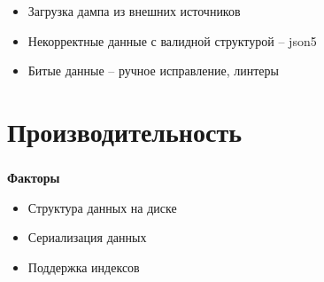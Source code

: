 \documentclass[usenames,dvipsnames, 18pt, compress, aspectratio=169]{beamer}
\begin{document}



\begin{frame}
    \frametitle{}
    \begin{center}
        \begin{itemize}[label={\MVRightarrow}]
            \item Загрузка дампа из внешних источников
            \item Некорректные данные с валидной структурой -- json5
            \item Битые данные -- ручное исправление, линтеры
        \end{itemize}
    \end{center}
\end{frame}

\fontsize{13pt}{14}\selectfont
\section{Производительность}
\fontsize{17pt}{18}\selectfont

\begin{frame}
    \frametitle{}
    \begin{center}
        \textbf{Факторы}
        \pause
        \begin{itemize}[label={\MVRightarrow}]
            \item <+-> Структура данных на диске
            \item <+-> Сериализация данных
            \item <+-> Поддержка индексов
        \end{itemize}
    \end{center}
\end{frame}
\end{document}
